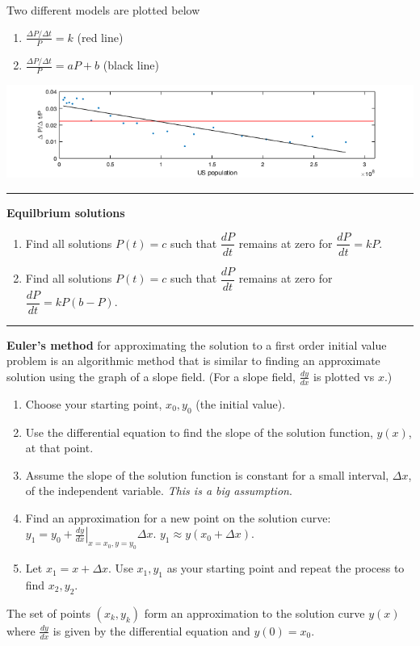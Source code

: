 \documentclass[12pt,letterpaper,noanswers]{exam}
\begin{document}
Two different models are plotted below
\begin{enumerate}
    \item $\frac{\Delta P/\Delta t}{P} = k$ (red line)
    \item $\frac{\Delta P/\Delta t}{P} = aP+b$ (black line)
\end{enumerate}

\includegraphics[width=\textwidth]{img/C29fitp2.png}

\vspace{0.2cm}
\hrule
\vspace{0.2cm}

\noindent\textbf{Equilbrium solutions}
\begin{enumerate}
\itemsep3em
    \item Find all solutions $P(t) = c$ such that $\dfrac{dP}{dt}$ remains at zero for $\dfrac{dP}{dt} = k P$.
    
    \item Find all solutions $P(t) = c$ such that $\dfrac{dP}{dt}$ remains at zero for $\dfrac{dP}{dt} = kP(b - P)$.
\end{enumerate}

\vspace{0.7in}

\vspace{0.2cm}
\hrule
\vspace{0.2cm}
\begin{tcolorbox}
\textbf{Euler's method} for approximating the solution to a first order initial value problem is an algorithmic method that is similar to finding an approximate solution using the graph of a slope field.  (For a slope field, $\frac{dy}{dx}$ is plotted vs $x$.)
\begin{enumerate}
    \item Choose your starting point, $x_0, y_0$ (the initial value).
    \item Use the differential equation to find the slope of the solution function, $y(x)$, at that point.
    \item Assume the slope of the solution function is constant for a small interval, $\Delta x$, of the independent variable.  \emph{This is a big assumption}.
    \item Find an approximation for a new point on the solution curve: $y_1 = y_0 + \left.\frac{dy}{dx}\right\vert_{x=x_0,y=y_0}\Delta x$.  $y_1 \approx y(x_0 + \Delta x)$.
    \item Let $x_1 = x+\Delta x$.  Use $x_1, y_1$ as your starting point and repeat the process to find $x_2, y_2$.
\end{enumerate}
The set of points $(x_k,y_k)$ form an approximation to the solution curve $y(x)$ where $\frac{dy}{dx}$ is given by the differential equation and $y(0) = x_0$.
\end{tcolorbox}
\end{document}
